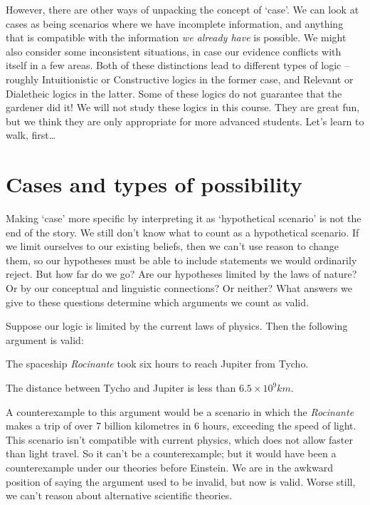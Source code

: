 \documentclass[PHIL101-Textbook.tex]{subfiles}
\begin{document}
However, there are other ways of unpacking the concept of `case'. We can look at cases as being scenarios where we have incomplete information, and anything that is compatible with the information \emph{we already have} is possible. We might also consider some inconsistent situations, in case our evidence conflicts with itself in a few areas. Both of these distinctions lead to different types of logic -- roughly Intuitionistic or Constructive logics in the former case, and Relevant or Dialetheic logics in the latter. Some of these logics do not guarantee that the gardener did it! We will not study these logics in this course. They are great fun, but we think they are only appropriate for more advanced students. Let's learn to walk, first\dots

\medskip

\section{Cases and types of possibility}
Making `case' more specific by interpreting it as `hypothetical scenario' is not the end of the story. We still don't know what to count as a hypothetical scenario. If we limit ourselves to our existing beliefs, then we can't use reason to change them, so our hypotheses must be able to include statements we would ordinarily reject. But how far do we go? Are our hypotheses limited by the laws of nature? Or by our conceptual and linguistic connections? Or neither? What answers we give to these questions determine which arguments we count as valid.


Suppose our logic is limited by the current laws of physics. Then the following argument is valid:
	\begin{earg}
		\item[] The spaceship \emph{Rocinante} took six hours to reach Jupiter from Tycho.
		\item[\therefore] The distance between Tycho and Jupiter is less than $6.5\times 10^9 km$.
	\end{earg}
A counterexample to this argument would be a scenario in which the \emph{Rocinante} makes a trip of over 7 billion kilometres in 6 hours, exceeding the speed of light. This scenario isn't compatible with current physics, which does not allow faster than light travel. So it can't be a counterexample; but it would have been a counterexample under our theories before Einstein. We are in the awkward position of saying the argument used to be invalid, but now is valid. Worse still, we can't reason about alternative  scientific theories.
\end{document}
